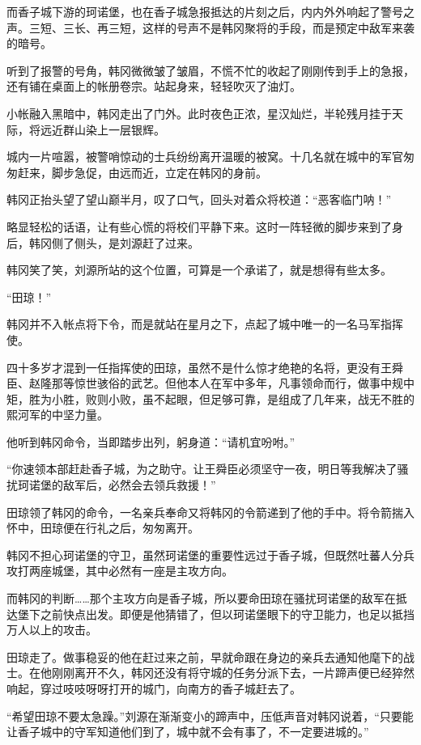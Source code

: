 而香子城下游的珂诺堡，也在香子城急报抵达的片刻之后，内内外外响起了警号之声。三短、三长、再三短，这样的号声不是韩冈聚将的手段，而是预定中敌军来袭的暗号。

听到了报警的号角，韩冈微微皱了皱眉，不慌不忙的收起了刚刚传到手上的急报，还有铺在桌面上的帐册卷宗。站起身来，轻轻吹灭了油灯。

小帐融入黑暗中，韩冈走出了门外。此时夜色正浓，星汉灿烂，半轮残月挂于天际，将远近群山染上一层银辉。

城内一片喧嚣，被警哨惊动的士兵纷纷离开温暖的被窝。十几名就在城中的军官匆匆赶来，脚步急促，由远而近，立定在韩冈的身前。

韩冈正抬头望了望山巅半月，叹了口气，回头对着众将校道：“恶客临门呐！”

略显轻松的话语，让有些心慌的将校们平静下来。这时一阵轻微的脚步来到了身后，韩冈侧了侧头，是刘源赶了过来。

韩冈笑了笑，刘源所站的这个位置，可算是一个承诺了，就是想得有些太多。

“田琼！”

韩冈并不入帐点将下令，而是就站在星月之下，点起了城中唯一的一名马军指挥使。

四十多岁才混到一任指挥使的田琼，虽然不是什么惊才绝艳的名将，更没有王舜臣、赵隆那等惊世骇俗的武艺。但他本人在军中多年，凡事领命而行，做事中规中矩，胜为小胜，败则小败，虽不起眼，但足够可靠，是组成了几年来，战无不胜的熙河军的中坚力量。

他听到韩冈命令，当即踏步出列，躬身道：“请机宜吩咐。”

“你速领本部赶赴香子城，为之助守。让王舜臣必须坚守一夜，明日等我解决了骚扰珂诺堡的敌军后，必然会去领兵救援！”

田琼领了韩冈的命令，一名亲兵奉命又将韩冈的令箭递到了他的手中。将令箭揣入怀中，田琼便在行礼之后，匆匆离开。

韩冈不担心珂诺堡的守卫，虽然珂诺堡的重要性远过于香子城，但既然吐蕃人分兵攻打两座城堡，其中必然有一座是主攻方向。

而韩冈的判断……那个主攻方向是香子城，所以要命田琼在骚扰珂诺堡的敌军在抵达堡下之前快点出发。即便是他猜错了，但以珂诺堡眼下的守卫能力，也足以抵挡万人以上的攻击。

田琼走了。做事稳妥的他在赶过来之前，早就命跟在身边的亲兵去通知他麾下的战士。在他刚刚离开不久，韩冈还没有将守城的任务分派下去，一片蹄声便已经猝然响起，穿过吱吱呀呀打开的城门，向南方的香子城赶去了。

“希望田琼不要太急躁。”刘源在渐渐变小的蹄声中，压低声音对韩冈说着，“只要能让香子城中的守军知道他们到了，城中就不会有事了，不一定要进城的。”


